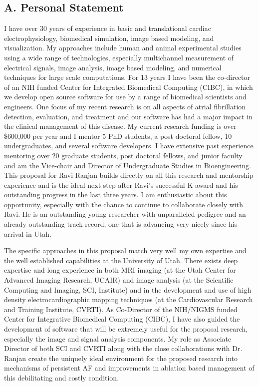 \documentclass[10pt]{article}
\begin{document}
\subsection*{A. Personal Statement}

I have over 30 years of experience in basic and translational cardiac
electrophysiology, biomedical simulation, image based modeling, and
visualization.  My approaches include human and animal experimental studies
using a wide range of technologies, especially multichannel measurement of
electrical signals, image analysis, image based modeling, and numerical
techniques for large scale computations.  For 13 years I have been the
co-director of an NIH funded Center for Integrated Biomedical Computing
(CIBC), in which we develop open source software for use by a range of
biomedical scientists and engineers.  One focus of my recent research is on
all aspects of atrial fibrillation detection, evaluation, and treatment and
our software has had a major impact in the clinical management of this
disease.  My current research funding is over \$600,000 per year and I
mentor 5 PhD students, a post doctoral fellow, 10 undergraduates, and
several software developers. I have extensive past experience mentoring
over 20 graduate students, post doctoral fellows, and junior faculty and am
the Vice-chair and Director of Undergraduate Studies in Bioengineering.
This proposal for Ravi Ranjan builds directly on all this research and
mentorship experience and is the ideal next step after Ravi's successful K
award and his outstanding progress in the last three years.  I am
enthusiastic about this opportunity, especially with the chance to continue
to collaborate closely with Ravi.  He is an outstanding young researcher
with unparalleled pedigree and an already outstanding track record, one
that is advancing very nicely since his arrival in Utah.  

The specific approaches in this proposal match very well my own expertise
and the well established capabilities at the University of Utah. There
exists deep expertise and long experience in both MRI imaging (at the Utah
Center for Advanced Imaging Research, UCAIR) and image analysis (at the
Scientific Computing and Imaging, SCI, Institute) and in the development
and use of high density electrocardiographic mapping techniques (at the
Cardiovascular Research and Training Institute, CVRTI).  As Co-Director of
the NIH/NIGMS funded Center for Integrative Biomedical Computing (CIBC), I
have also guided the development of software that will be extremely useful
for the proposal research, especially the image and signal analysis
components. My role as Associate Director of both SCI and CVRTI along with
the close collaborations with Dr. Ranjan create the uniquely ideal
environment for the proposed research into mechanisms of persistent AF and
improvements in ablation based management of this debilitating and costly
condition.
\end{document}
